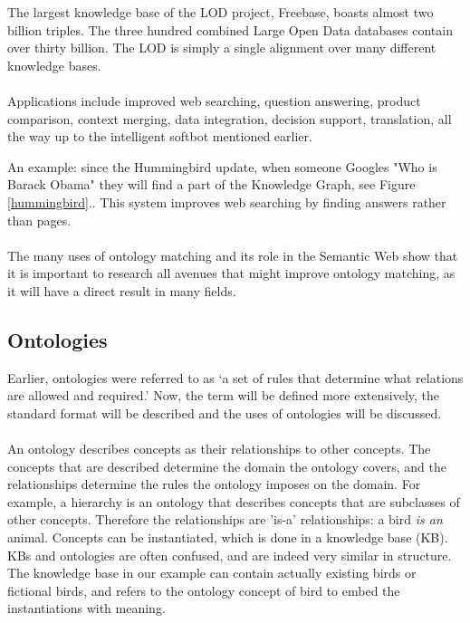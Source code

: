\documentclass{article}
\begin{document}
 The largest knowledge base of the LOD project, Freebase, boasts almost two billion triples. The three hundred combined Large Open Data databases contain over thirty billion\cite{dbpedia, lod}. The LOD is simply a single alignment over many different knowledge bases.
 \paragraph{}
 Applications include improved web searching, question answering, product comparison, context merging, data integration, decision support, translation, all the way up to the intelligent softbot mentioned earlier\cite{schreiber, future}.
 
 An example: since the Hummingbird update, when someone Googles "Who is Barack Obama" they will find a part of the Knowledge Graph, see Figure \ref{hummingbird}.. This system improves web searching by finding answers rather than pages. 
 \paragraph{}
 The many uses of ontology matching and its role in the Semantic Web show that it is important to research all avenues that might improve ontology matching, as it will have a direct result in many fields.
 
 \subsection{Ontologies}
 Earlier, ontologies were referred to as `a set of rules that determine what relations are allowed and required.' Now, the term will be defined more extensively, the standard format will be described and the uses of ontologies will be discussed.
 \paragraph{}
 An ontology describes concepts as their relationships to other concepts. The concepts that are described determine the domain the ontology covers, and the relationships determine the rules the ontology imposes on the domain. For example, a hierarchy is an ontology that describes concepts that are subclasses of other concepts. Therefore the relationships are 'is-a' relationships: a bird \emph{is an} animal.
 Concepts can be instantiated, which is done in a knowledge base (KB). KBs and ontologies are often confused, and are indeed very similar in structure. The knowledge base in our example can contain actually existing birds or fictional birds, and refers to the ontology concept of bird to embed the instantiations with meaning\cite{ontologyGuru}.
 
\end{document}
